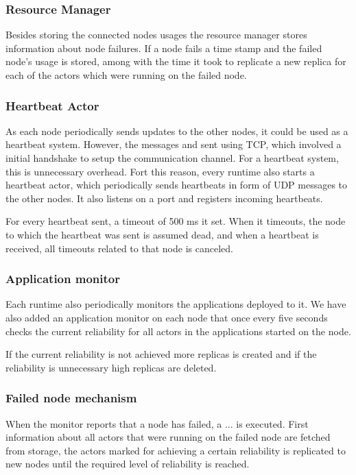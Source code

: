 \documentclass{cslthse-msc}
\begin{document}

\subsubsection{Resource Manager}
Besides storing the connected nodes usages the resource manager stores information about node failures. If a node fails a time stamp and the failed node's usage is stored, among with the time it took to replicate a new replica for each of the actors which were running on the failed node.


\subsubsection{Heartbeat Actor}
As each node periodically sends updates to the other nodes, it could be used as a heartbeat system. However, the messages and sent using TCP, which involved a initial handshake to setup the communication channel. For a heartbeat system, this is unnecessary overhead. Fort this reason, every runtime also starts a heartbeat actor, which periodically sends heartbeats in form of UDP messages to the other nodes. It also listens on a port and registers incoming heartbeats.

For every heartbeat sent, a timeout of 500 ms it set. When it timeouts, the node to which the heartbeat was sent is assumed dead, and when a heartbeat is received, all timeouts related to that node is canceled.

\subsubsection{Application monitor}
Each runtime also periodically monitors the applications deployed to it. We have also added an application monitor on each node that once every five seconds checks the current reliability for all actors in the applications started on the node. 

If the current reliability is not achieved more replicas is created and if the reliability is unnecessary high replicas are deleted.

\subsubsection{Failed node mechanism}
When the monitor reports that a node has failed, a ... is executed. First information about all actors that were running on the failed node are fetched from storage, the actors marked for achieving a certain reliability is replicated to new nodes until the required level of reliability is reached. 
\end{document}
